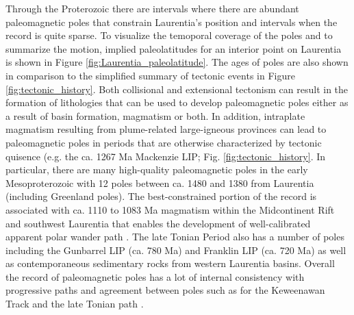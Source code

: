 \documentclass[11pt,letterpaper]{article}
\begin{document}
Through the Proterozoic there are intervals where there are abundant paleomagnetic poles that constrain Laurentia's position and intervals when the record is quite sparse. To visualize the temoporal coverage of the poles and to summarize the motion, implied paleolatitudes for an interior point on Laurentia is shown in Figure \ref{fig:Laurentia_paleolatitude}. The ages of poles are also shown in comparison to the simplified summary of tectonic events in Figure \ref{fig:tectonic_history}. Both collisional and extensional tectonism can result in the formation of lithologies that can be used to develop paleomagnetic poles either as a result of basin formation, magmatism or both. In addition, intraplate magmatism resulting from plume-related large-igneous provinces can lead to paleomagnetic poles in periods that are otherwise characterized by tectonic quisence (e.g. the ca. 1267 Ma Mackenzie LIP; Fig. \ref{fig:tectonic_history}. In particular, there are many high-quality paleomagnetic poles in the early Mesoproterozoic with 12  poles between ca. 1480 and 1380 from Laurentia (including Greenland poles). The best-constrained portion of the record is associated with ca. 1110 to 1083 Ma magmatism within the Midcontinent Rift and southwest Laurentia that enables the development of well-calibrated apparent polar wander path \citep{Swanson-Hysell2019a}. The late Tonian Period also has a number of poles including the Gunbarrel LIP (ca. 780 Ma) and Franklin LIP (ca. 720 Ma) as well as contemporaneous sedimentary rocks from western Laurentia basins. Overall the record of paleomagnetic poles has a lot of internal consistency with progressive paths and agreement between poles such as for the Keweenawan Track \citep{Swanson-Hysell2019a} and the late Tonian path \citep{Eyster2019a}. 
\end{document}
